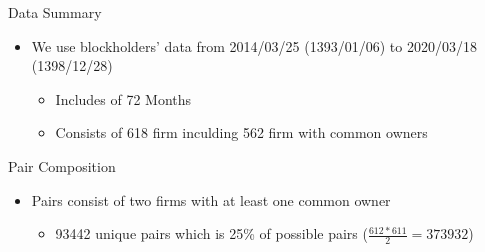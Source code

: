 \documentclass[handout]{beamer}
\begin{document}
		
		
			\begin{frame}{Data Summary}
			\begin{itemize}
				\item We use blockholders' data from 2014/03/25 \scriptsize{(1393/01/06)} \normalsize to 2020/03/18 \scriptsize (1398/12/28)  \normalsize
				\begin{itemize}
					\item Includes of 72 Months
					\item Consists of 618 firm inculding 562 firm with common owners
					
				\end{itemize}
			\end{itemize}
			
			\begin{table}[htbp]
				\centering
				\resizebox{0.8\textwidth}{!}
				{
					
				}
			\end{table}
			
		\end{frame}
		
		
		
		\begin{frame}{Pair Composition}
			\begin{itemize}
			
				\item Pairs consist of two firms  with at least one common owner
				\begin{itemize}
					\item  93442 unique pairs which is 25\% of possible pairs 
					\tiny ($ \frac{612*611}{2}= 373932 $)
					\normalsize
				\end{itemize}
			\end{itemize}
			
			\begin{table}[htbp]
				\centering
				{
					\footnotesize
				
					
				}
			\end{table}
			
			
			\begin{table}
				\resizebox{0.8\textwidth}{!}
				{
					
				}
			\end{table}%
			
		\end{frame}  
		
		
		
	
		
\end{document}

